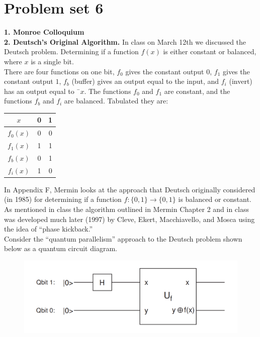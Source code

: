 \documentclass{book}
\theoremstyle{definition}
\begin{document}
\newpage





\section{Problem set 6}



\noindent \textbf{1. Monroe Colloquium}\\



\noindent \textbf{2. Deutsch's Original Algorithm.} In class on March 12th we discussed the Deutsch problem. Determining if a function $f(x)$ is either constant or balanced, where $x$ is a single bit.\\

\noindent There are four functions on one bit, $f_0$ gives the constant output $0$, $f_1$ gives the constant output $1$, $f_b$ (buffer) gives an output equal to the input, and $f_i$ (invert) has an output
equal to ¯$x$. The functions $f_0$ and $f_1$ are constant, and the functions $f_b$ and $f_i$ are balanced.
Tabulated they are:\\
\begin{center}
\begin{tabular}{|c|c|c|}
	\hline
	$x$&0&1\\
	\hline
	$f_0(x)$&0&0\\
	\hline
	$f_1(x)$&1&1\\
	\hline
	$f_b(x)$&0&1\\
	\hline
	$f_i(x)$&1&0\\
	\hline
\end{tabular}
\end{center}

\noindent In Appendix F, Mermin looks at the approach that Deutsch originally considered (in 1985) for determining if a function $f : \{0, 1\} \to \{0, 1\}$ is balanced or constant. As mentioned in class the algorithm outlined in Mermin Chapter 2 and in class was developed much later (1997) by Cleve, Ekert, Macchiavello, and Mosca using the idea of ``phase kickback.''\\

\noindent Consider the ``quantum parallelism'' approach to the Deutsch problem shown below as a quantum circuit diagram.
\begin{figure}[!htb]
	\centering
	\includegraphics[scale=0.25]{deutsch}
\end{figure}
\end{document}
